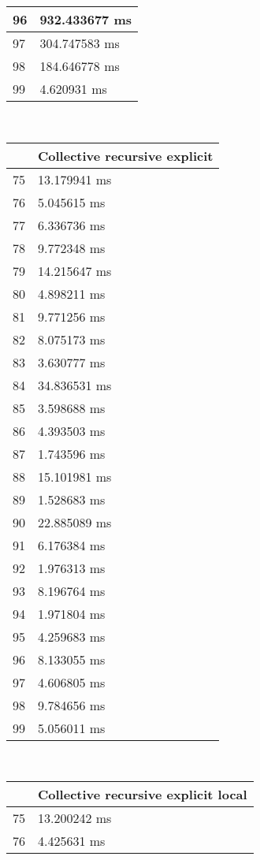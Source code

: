 \begin{multicols}{2}
\begin{tabular}{|l|l|}
		96 & 932.433677 ms \\ \hline
		97 & 304.747583 ms \\ \hline
		98 & 184.646778 ms \\ \hline
		99 & 4.620931 ms \\ \hline
	\end{tabular}\\
	\begin{tabular}{|l|l|}
		\hline
		& Collective recursive explicit \\ \hline
		75 & 13.179941 ms \\ \hline
		76 & 5.045615 ms \\ \hline
		77 & 6.336736 ms \\ \hline
		78 & 9.772348 ms \\ \hline
		79 & 14.215647 ms \\ \hline
		80 & 4.898211 ms \\ \hline
		81 & 9.771256 ms \\ \hline
		82 & 8.075173 ms \\ \hline
		83 & 3.630777 ms \\ \hline
		84 & 34.836531 ms \\ \hline
		85 & 3.598688 ms \\ \hline
		86 & 4.393503 ms \\ \hline
		87 & 1.743596 ms \\ \hline
		88 & 15.101981 ms \\ \hline
		89 & 1.528683 ms \\ \hline
		90 & 22.885089 ms \\ \hline
		91 & 6.176384 ms \\ \hline
		92 & 1.976313 ms \\ \hline
		93 & 8.196764 ms \\ \hline
		94 & 1.971804 ms \\ \hline
		95 & 4.259683 ms \\ \hline
		96 & 8.133055 ms \\ \hline
		97 & 4.606805 ms \\ \hline
		98 & 9.784656 ms \\ \hline
		99 & 5.056011 ms \\ \hline
	\end{tabular}\\
	\begin{tabular}{|l|l|}
		\hline
		& Collective recursive explicit local \\ \hline
		75 & 13.200242 ms \\ \hline
		76 & 4.425631 ms \\ \hline

\end{tabular}
\end{multicols}
